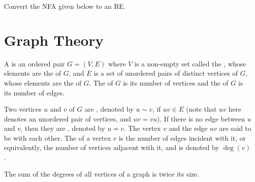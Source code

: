 \begin{Exercise}
Convert the NFA given below to an RE.
\begin{center}
\end{center}


\end{Exercise}

\clearpage

\section{Graph Theory}\label{sec:GraphTheory}

A  is an ordered pair $G = (V, E)$ where $V$ is a non-empty set called the , whose elements are the  of $G$, and $E$ is a set of unordered pairs of distinct vertices of $G$, whose elements are the  of $G$. The  of $G$ is its number of vertices and the  of $G$ is its number of edges.

Two vertices $u$ and $v$ of $G$ are , denoted by $u \sim v$, if $uv \in E$ (note that $uv$ here denotes an unordered pair of vertices, and $uv = vu$). If there is no edge between $u$ and $v$, then they are , denoted by $u \nsim v$. The vertex $v$ and the edge $uv$ are said to be  with each other. The  of a vertex $v$ is the number of edges incident with it, or equivalently, the number of vertices adjacent with it, and is denoted by $\deg(v)$.

\begin{Lemma}
The sum of the degrees of all vertices of a graph is twice its size.
\end{Lemma}

